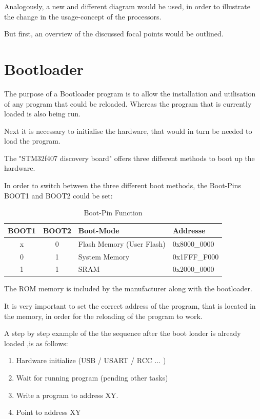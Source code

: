 Analogously, a new and different diagram would be used, in order to illustrate the
change in the usage-concept of the processors.

But first, an overview of the discussed focal points would be outlined.

\section{Bootloader}
The purpose of a Bootloader program is to allow the installation and utilisation
of any program that could be reloaded. Whereas the program that is currently loaded is also being run.

Next it is necessary to initialise the hardware, that would in turn be needed to load the program.

The "STM32f407 discovery board" offers three different methods to boot up the hardware.\citep{RB-12}

In order to switch between the three different boot methods, the Boot-Pins BOOT1
and BOOT2 could be set:

\begin{table}[ht]
\centering
\begin{tabular}{|c|c|l|l|}
\hline \hline
  BOOT1 & BOOT2 & Boot-Mode & Addresse\\ \hline
  x & 0 & Flash Memory (User Flash) & 0x8000\_0000\\
\hline
  0 & 1 & System Memory & 0x1FFF\_F000\\
\hline
 1  & 1 & SRAM & 0x2000\_0000\\
\hline
\end{tabular}
\caption{Boot-Pin Function}
\end{table}

The ROM memory is included by the manufacturer along with the bootloader.

It is very important to set the correct address of the program, that is located
in the memory, in order for the reloading of the program to work.

A step by step example of the the sequence after the boot loader is already
loaded ,is as follows:

\begin{enumerate}
\item Hardware initialize (USB / USART / RCC ... )
\item Wait for running program (pending other tasks)
\item Write a program to address XY.
\item Point to address XY
\end{enumerate}

